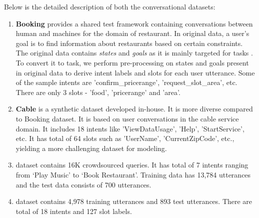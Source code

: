 Below is the detailed description of both the conversational datasets:
\begin{enumerate}
    \item \textbf{Booking} provides a shared test framework containing conversations between human and machines for the domain of restaurant. In original  data, a user's goal is to find information about restaurants based on certain constraints. The original data contains \textit{states} and \textit{goals} as it is mainly targeted for  tasks \cite{glad, statenet}. To convert it to  task, we perform pre-processing on states and goals present in original data to derive intent labels and slots for each user utterance. Some of the sample intents are 'confirm\_pricerange', 'request\_slot\_area', etc. There are only 3 slots - 'food', 'pricerange' and 'area'.
    \item \textbf{Cable} is a synthetic  dataset developed in-house.  It is more diverse compared to {Booking} dataset. It is based on user conversations in the cable service domain. It includes 18 intents like 'ViewDataUsage', 'Help', 'StartService', etc. It has total of 64 slots such as 'UserName', 'CurrentZipCode', etc., yielding a more challenging dataset for modeling.
    \item \textbf{} dataset contains 16K crowdsourced queries. It has total of 7 intents ranging from ‘Play Music’ to ‘Book Restaurant’. Training data has 13,784 utterances and the test data consists of 700 utterances.
    \item \textbf{} dataset contains 4,978 training utterances and 893 test utterances. There are total of 18 intents and 127 slot labels.
\end{enumerate}


